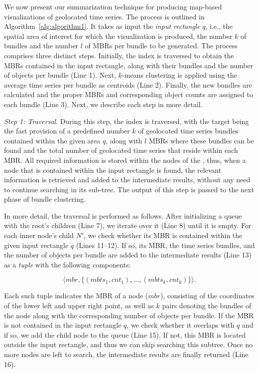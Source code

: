 We now present our summarization technique for producing map-based visualizations of geolocated time series. The process is outlined in Algorithm~\ref{alg:algorithm1}. It takes as input the {\em input rectangle} $q$, i.e., the spatial area of interest for which the visualization is produced, the number $k$ of bundles and the number $l$ of MBRs per bundle  to be generated. The process comprises three distinct steps. Initially, the \btsr index is traversed to obtain the MBRs contained in the input rectangle, along with their bundles and the number of objects per bundle (Line 1). Next, $k$-means clustering is applied using the average time series per bundle as centroids (Line 2). Finally, the new bundles are calculated and the proper MBRs and corresponding object counts are assigned to each bundle (Line 3). Next, we describe each step in more detail.

\emph{Step 1: \btsr Traversal}.
During this step, the \btsr index is traversed, with the target being the fast provision of a predefined number $k$ of geolocated time series bundles contained within the given area $q$, along with $l$ MBRs where these bundles can be found and the total number of geolocated time series that reside within each MBR. All required information is stored within the nodes of the \btsr, thus, when a node that is contained within the input rectangle is found, the relevant information is retrieved and added to the intermediate results, without any need to continue searching in its sub-tree. The output of this step is passed to the next phase of bundle clustering. 

In more detail, the traversal is performed as follows. After initializing a queue with the root's children (Line 7), we iterate over it (Line 8) until it is empty. For each inner node's child $N'$, we check whether its MBR is contained within the given input rectangle $q$ (Lines 11--12). If so, its MBR, the time series bundles, and the number of objects per bundle are added to the intermediate results (Line 13) as a {\em tuple} with the following components:

\begin{equation*}
\langle mbr, \{ (mbts_1,cnt_1), ..., (mbts_k, cnt_k) \} \rangle.
\end{equation*}

\noindent Each such tuple indicates the MBR of a node ($mbr$), consisting of the coordinates of the lower left and upper right point, as well as $k$ pairs denoting the bundles of the node along with the corresponding number of objects per bundle. If the MBR is not contained in the input rectangle $q$, we check whether it overlaps with $q$ and if so, we add the child node to the queue (Line 15). If not, this MBR is located outside the input rectangle, and thus we can skip searching this subtree. Once no more nodes are left to search, the intermediate results are finally returned (Line 16).

